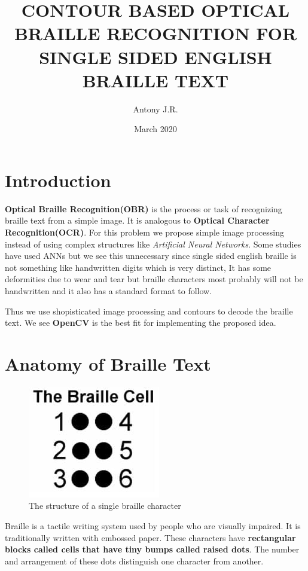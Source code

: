 \documentclass{article}
\title{CONTOUR BASED OPTICAL BRAILLE RECOGNITION FOR SINGLE SIDED ENGLISH BRAILLE TEXT}
\author{Antony J.R.}
\date{March 2020}
\begin{document}
\maketitle

\section{Introduction}

\textbf{Optical Braille Recognition(OBR)} is the process or task of recognizing braille text from a simple image.
It is analogous to \textbf{Optical Character Recognition(OCR)}. For this problem we propose simple image processing 
instead of using complex structures like \emph{Artificial Neural Networks}. Some studies have used ANNs but we see
this unnecessary since single sided english braille is not something like handwritten digits which is very distinct,
It has some deformities due to wear and tear but braille characters most probably will not be handwritten 
and it also has a standard format to follow.

Thus we use shopisticated image processing and contours to decode the braille text. We see \textbf{OpenCV} is the best 
fit for implementing the proposed idea.

\section{Anatomy of Braille Text}

\begin{figure}[!htb]
\caption{The structure of a single braille character}
\centering
\includegraphics[scale=0.3]{braillecell}
\end{figure}



Braille is a tactile writing system used by people who are visually impaired. It is traditionally written with embossed paper.
These characters have \textbf{rectangular blocks called cells that have tiny bumps called raised dots}. The number and arrangement of these dots distinguish one character from another.
\end{document}

